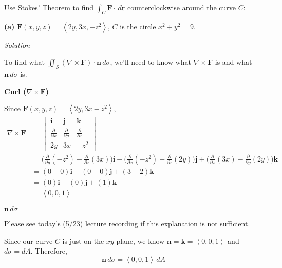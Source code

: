 \documentclass{article}
\newcommand{\lrp}[1]{\left( #1 \right)}
\newcommand{\lra}[1]{\left\langle #1 \right\rangle}
\renewcommand{\i}[0]{\mathbf{i}}
\renewcommand{\j}[0]{\mathbf{j}}
\renewcommand{\k}[0]{\mathbf{k}}
\renewcommand{\r}[0]{\mathbf{r}}
\newcommand{\F}[0]{\mathbf{F}}
\newcommand{\n}[0]{\mathbf{n}}
\newcommand{\Solution}{\textit{Solution}}
\begin{document}
Use Stokes' Theorem to find $\displaystyle \int_C \F\cdot \,d\r$ counterclockwise around the curve $C$:

{}\textbf{(a)} $\F(x,y,z)=\lra{2y,3x,-z^2}$, $C$ is the circle $x^2+y^2=9$.

\Solution

To find what $\displaystyle\iint_S \lrp{\nabla \times \F}\cdot \n\,d\sigma$, we'll need to know what $\nabla \times \F$ is and what $\n\,d\sigma$ is.

{} \textbf{Curl ($\displaystyle\nabla \times \F$)}

Since $\F(x,y,z)=\lra{2y,3x-z^2}$,
\begin{align*}
    \nabla \times \F &=\begin{vmatrix}
    \i & \j & \k \\
    \frac{\partial }{\partial x} &  \frac{\partial }{\partial y} &
     \frac{\partial }{\partial z}\\
     2y& 3x & -z^2
    \end{vmatrix}\\
    &=\Bigg(\frac{\partial }{\partial y}(-z^2)-\frac{\partial }{\partial z}(3x)\Bigg)\i-\Bigg(\frac{\partial}{\partial x}(-z^2)-\frac{\partial}{\partial z}(2y)\Bigg)\j+\Bigg(\frac{\partial}{\partial x}(3x)-\frac{\partial}{\partial y}({2y})\Bigg)\k\\
    &=\lrp{0-0}\i-\lrp{0-0}\j +\lrp{3-2}\k\\
    &=\lrp{0}\i-\lrp{0}\j+\lrp{1}\k\\
    &=\lra{0,0,1}
\end{align*}

{} \textbf{$\n\,d\sigma$}


Please see today's (5/23) lecture recording if this explanation is not sufficient.

Since our curve $C$ is just on the $xy$-plane, we know $\n=\k=\lra{0,0,1}$ and $d\sigma = dA$. Therefore,
\begin{equation*}
    \n\,d\sigma =\lra{0,0,1}\,dA
\end{equation*}
\end{document}
